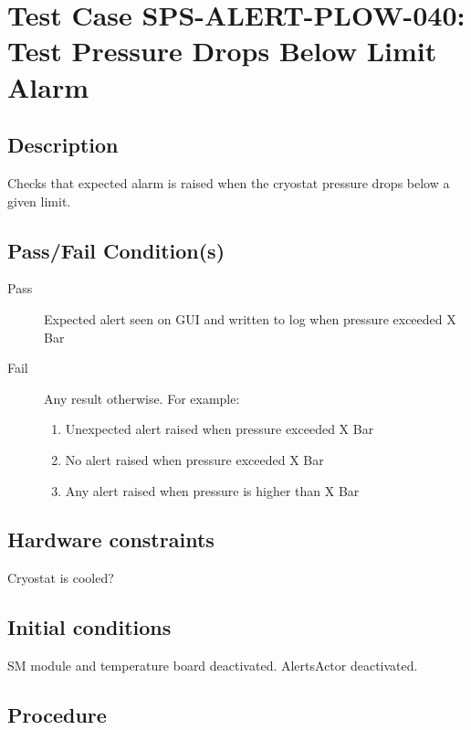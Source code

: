 \section{Test Case SPS-ALERT-PLOW-040: Test Pressure Drops Below Limit Alarm}

\subsection{Description}

Checks that expected alarm is raised when the cryostat pressure drops below a given limit.

\subsection{Pass/Fail Condition(s)}

\begin{description}
\item [Pass] Expected alert seen on GUI and written to log when pressure exceeded X Bar
\item [Fail] Any result otherwise. For example:

\begin{enumerate}
    \item Unexpected alert raised when pressure exceeded X Bar
    \item No alert raised when pressure exceeded X Bar
    \item Any alert raised when pressure is higher than X Bar
\end{enumerate}
\end{description}

\subsection{Hardware constraints}

Cryostat is cooled?

\subsection{Initial conditions}

SM module and temperature board deactivated. AlertsActor deactivated.

\subsection{Procedure}


